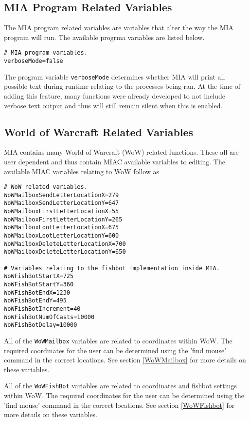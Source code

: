 \subsection{MIA Program Related Variables}

The MIA program related variables are variables that alter the way the MIA program will run. The available progrma variables are listed below.

\begin{lstlisting}
# MIA program variables.
verboseMode=false
\end{lstlisting}

The program variable \lstinline{verboseMode} determines whether MIA will print all possible text during runtime relating to the processes being ran. At the time of adding this feature, many functions were already developed to not include verbose text output and thus will still remain silent when this is enabled.

\subsection{World of Warcraft Related Variables}

MIA contains many World of Warcraft (WoW) related functions. These all are user dependent and thus contain MIAC available variables to editing. The available MIAC variables relating to WoW follow as

\begin{lstlisting}
# WoW related variables.
WoWMailboxSendLetterLocationX=279
WoWMailboxSendLetterLocationY=647
WoWMailboxFirstLetterLocationX=55
WoWMailboxFirstLetterLocationY=265
WoWMailboxLootLetterLocationX=675
WoWMailboxLootLetterLocationY=600
WoWMailboxDeleteLetterLocationX=700
WoWMailboxDeleteLetterLocationY=650

# Variables relating to the fishbot implementation inside MIA.
WoWFishBotStartX=725
WoWFishBotStartY=360
WoWFishBotEndX=1230
WoWFishBotEndY=495
WoWFishBotIncrement=40
WoWFishBotNumOfCasts=10000
WoWFishBotDelay=10000
\end{lstlisting}

All of the \lstinline{WoWMailbox} variables are related to coordinates within WoW. The required coordinates for the user can be determined using the 'find mouse' command in the correct locations. See section \ref{WoWMailbox} for more details on these variables.

All of the \lstinline{WoWFishBot} variables are related to coordinates and fishbot settings within WoW. The required coordinates for the user can be determined using the 'find mouse' command in the correct locations. See section \ref{WoWFishbot} for more details on these variables.




